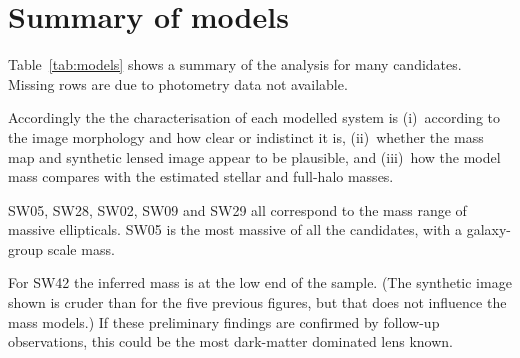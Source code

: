 \section{Summary of models}\label{sec:summary}

Table~\ref{tab:models} shows a summary of the analysis for many candidates.
Missing rows are due to photometry data not available.

Accordingly the the characterisation of each modelled system is
(i)~according to the image morphology and how clear or indistinct it
is, (ii)~whether the mass map and synthetic lensed image appear to be
plausible, and (iii)~how the model mass compares with the estimated
stellar and full-halo masses.

SW05, SW28, SW02, SW09 and SW29 all correspond to the mass range of
massive ellipticals.  SW05 is the most massive of all the candidates,
with a galaxy-group scale mass.

For SW42 the inferred mass is at the low end of the sample.  (The
synthetic image shown is cruder than for the five previous figures,
but that does not influence the mass models.)  If these preliminary
findings are confirmed by follow-up observations, this could be the
most dark-matter dominated lens known.

